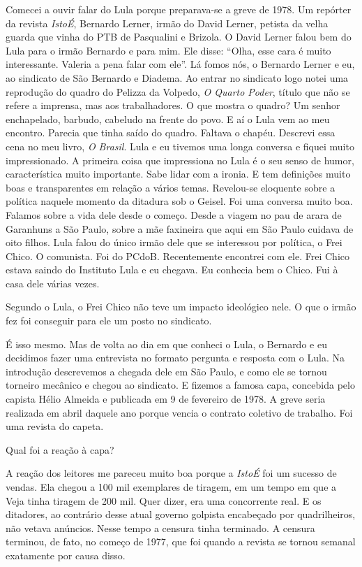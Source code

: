 \falaM Comecei a ouvir falar do Lula porque preparava-se a greve de 1978. Um
repórter da revista \emph{IstoÉ}, Bernardo Lerner, irmão do David
Lerner, petista da velha guarda que vinha do PTB de Pasqualini e
Brizola. O David Lerner falou bem do Lula para o irmão Bernardo e para
mim. Ele disse: ``Olha, esse cara é muito interessante. Valeria a pena
falar com ele''. Lá fomos nós, o Bernardo Lerner e eu, ao sindicato de
São Bernardo e Diadema. Ao entrar no sindicato logo notei uma reprodução
do quadro do Pelizza da Volpedo, \emph{O Quarto Poder}, título que não
se refere a imprensa, mas aos trabalhadores. O que mostra o quadro? Um
senhor enchapelado, barbudo, cabeludo na frente do povo. E aí o Lula vem
ao meu encontro. Parecia que tinha saído do quadro. Faltava o chapéu.
Descrevi essa cena no meu livro, \emph{O Brasil}. Lula e eu tivemos uma
longa conversa e fiquei muito impressionado. A primeira coisa que
impressiona no Lula é o seu senso de humor, característica muito
importante. Sabe lidar com a ironia. E tem definições muito boas e
transparentes em relação a vários temas. Revelou-se eloquente sobre a
política naquele momento da ditadura sob o Geisel. Foi uma conversa
muito boa. Falamos sobre a vida dele desde o começo. Desde a viagem no
pau de arara de Garanhuns a São Paulo, sobre a mãe faxineira que aqui em
São Paulo cuidava de oito filhos. Lula falou do único irmão dele que se
interessou por política, o Frei Chico. O comunista. Foi do PCdoB.
Recentemente encontrei com ele. Frei Chico estava saindo do Instituto
Lula e eu chegava. Eu conhecia bem o Chico. Fui à casa dele várias
vezes.

\falaG Segundo o Lula, o Frei Chico não teve um impacto ideológico nele. O
que o irmão fez foi conseguir para ele um posto no sindicato.

\falaM É isso mesmo. Mas de volta ao dia em que conheci o Lula, o Bernardo e
eu decidimos fazer uma entrevista no formato pergunta e resposta com o
Lula. Na introdução descrevemos a chegada dele em São Paulo, e como ele
se tornou torneiro mecânico e chegou ao sindicato. E fizemos a famosa
capa, concebida pelo capista Hélio Almeida e publicada em 9 de fevereiro
de 1978. A greve seria realizada em abril daquele ano porque vencia o
contrato coletivo de trabalho. Foi uma revista do capeta.

\falaG Qual foi a reação à capa?

\falaM A reação dos leitores me pareceu muito boa porque a \emph{IstoÉ} foi
um sucesso de vendas. Ela chegou a 100 mil exemplares de tiragem, em um
tempo em que a Veja tinha tiragem de 200 mil. Quer dizer, era uma
concorrente real. E os ditadores, ao contrário desse atual governo
golpista encabeçado por quadrilheiros, não vetava anúncios. Nesse tempo
a censura tinha terminado. A censura terminou, de fato, no começo de
1977, que foi quando a revista se tornou semanal exatamente por causa
disso.

